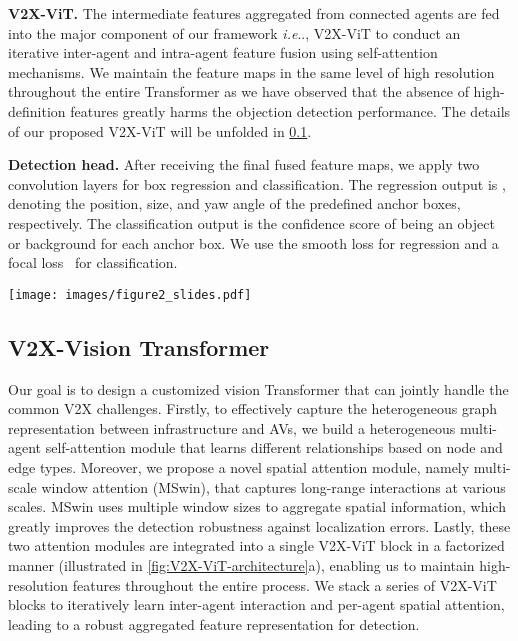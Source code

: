 \documentclass[runningheads]{llncs}
\makeatletter
\DeclareRobustCommand\onedot{\futurelet\@let@token\@onedot}
\def\@onedot{\ifx\@let@token.\else.\null\fi\xspace}
\def\ie{\emph{i.e}\onedot} \def\Ie{\emph{I.e}\onedot}
\makeatother
\begin{document}
\noindent\textbf{V2X-ViT.}
The intermediate features  aggregated from connected agents are fed  into the major component of our framework \ie, V2X-ViT to conduct an iterative inter-agent and intra-agent feature fusion using self-attention mechanisms. We maintain the feature maps in the same level of high resolution throughout the entire Transformer as we have observed that the absence of high-definition features greatly harms the objection detection performance. The details of our proposed V2X-ViT will be unfolded in \cref{ssec:v2ctransformer}.

\noindent\textbf{Detection head.} After receiving the final fused feature maps, we apply two  convolution layers for box regression and classification. The regression output is , denoting the position, size, and yaw angle of the predefined anchor boxes, respectively. The classification output is the confidence score of being an object or background for each anchor box. We use the smooth  loss for regression and a focal loss~\cite{lin2017focal} for classification.


\begin{figure*}[!t]
\centering
\texttt{[image: images/figure2\_slides.pdf]}
\caption{\textbf{V2X-ViT architecture.} (a) The architecture of our proposed V2X-ViT model. (b) Heterogeneous multi-agent self-attention (HMSA) presented in \cref{sssec:hmasa}. (c) Multi-scale window attention module (MSwin) illustrated in \cref{sssec:mswin}.}
\label{fig:V2X-ViT-architecture}
\vspace{-4mm}
\end{figure*}

\subsection{V2X-Vision Transformer}
\label{ssec:v2ctransformer}
Our goal is to design a customized vision Transformer that can jointly handle the common V2X challenges.
Firstly, to effectively capture the heterogeneous graph representation between infrastructure and AVs, we build a heterogeneous multi-agent self-attention module that learns different relationships based on node and edge types. Moreover, we propose a novel spatial attention module, namely multi-scale window attention (MSwin), that captures long-range interactions at various scales. MSwin uses multiple window sizes to aggregate spatial information, which greatly improves the detection robustness against localization errors. Lastly, these two attention modules are integrated into a single V2X-ViT block in a factorized manner (illustrated in \cref{fig:V2X-ViT-architecture}a), enabling us to maintain high-resolution features throughout the entire process. We stack a series of V2X-ViT blocks to iteratively learn inter-agent interaction and per-agent spatial attention, leading to a robust aggregated feature representation for detection.
\end{document}
